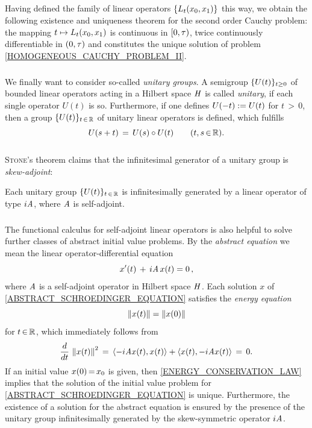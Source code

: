 \documentclass[11pt,twoside]{article}
\begin{document}
\subparagraph{} %
Having defined the family of linear operators $\{{L}_t(x_0,x_1)\}$ this way,
we obtain the following existence and uniqueness theorem
for the second order Cauchy problem:
the mapping $t \mapsto {L}_t(x_0,x_1)$ is continuous in $[0,\tau)$,
twice continuously differentiable in $(0,\tau)$ and
constitutes the unique solution
of problem \eqref{HOMOGENEOUS_CAUCHY_PROBLEM_II}.

\subparagraph{} %
We finally want to consider so-called \textit{unitary groups}.
A semigroup $\{{U}(t)\}_{t \geq 0}$ of bounded linear operators
acting in a Hilbert space $\mathit{H}$ is called \textit{unitary},
if each single operator $U(t)$ is so.
Furthermore,
if one defines ${U}(-t) := {U}(t)$ for $t {\,>\,} 0$,
then a group $\{{U}(t)\}_{t {\,\in\,} {\mathbb{R}}}$ of unitary linear operators is defined,
which fulfills
\[
{U}(s+t) \,=\, {U}(s) \circ {U}(t) \quad \quad (t,s {\,\in\,} {\mathbb{R}}).
\]
\subparagraph{} %
\textsc{Stone}'s theorem claims
that the infinitesimal generator of a unitary group is \textit{skew-adjoint}:

\begin{theorem1}\label{STONE_THEOREM_FOR_UNITARY_GROUPS}
Each unitary group $\{{U}(t)\}_{t {\,\in\,} {\mathbb{R}}}$
is infinitesimally generated by a linear operator of type $i \mathit{A}$,
where $\mathit{A}$ is self-adjoint.
\end{theorem1}

\subparagraph{} %
The functional calculus for self-adjoint linear operators
is also helpful to solve further classes of abstract initial value problems.
By the \textit{abstract {\SCHROEDINGER} equation}
we mean the linear operator-differential equation
\begin{equation}\label{ABSTRACT_SCHROEDINGER_EQUATION}
x'(t) \,+\, i \mathit{A} \, x(t) = 0\,,
\end{equation}
where $\mathit{A}$ is a self-adjoint operator in Hilbert space $\mathit{H}$.
Each solution $x$ of \eqref{ABSTRACT_SCHROEDINGER_EQUATION}
satisfies the \textit{energy equation}
\begin{equation}\label{ENERGY_CONSERVATION_LAW}
\left\lVert x(t) \right\rVert = \left\lVert x(0) \right\rVert
\end{equation}
for $t {\,\in\,} {\mathbb{R}}$,
which immediately follows from
\[
\frac{d}{dt} \, \left\lVert x(t) \right\rVert^2
\,=\,
\langle -i\mathit{A} x(t),x(t) \rangle + \langle x(t),-i \mathit{A} x(t) \rangle \,=\, 0.
\]
If an initial value $x(0) {\,=\,} x_0$ is given,
then \eqref{ENERGY_CONSERVATION_LAW} implies
that the solution of the initial value problem 
for \eqref{ABSTRACT_SCHROEDINGER_EQUATION} is unique.
Furthermore,
the existence of a solution for the abstract {\SCHROEDINGER} equation
is ensured by the presence of the unitary group
infinitesimally generated by the skew-symmetric operator $i \mathit{A}$.
\end{document}
